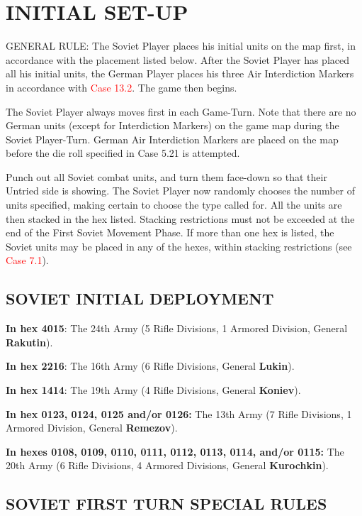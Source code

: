 \section{INITIAL SET-UP}
GENERAL RULE:
The Soviet Player places his initial units on the map first, in accordance with the placement listed below. After the Soviet Player has placed all his initial units, the German Player places his three Air Interdiction Markers in accordance with \textcolor{red}{Case 13.2}. The game then begins.

The Soviet Player always moves first in each Game-Turn. Note that there are no German units (except for Interdiction Markers) on the game map during the Soviet Player-Turn. German Air Interdiction Markers are placed on the map before the die roll specified in Case 5.21 is attempted.

Punch out all Soviet combat units, and turn them face-down so that their Untried side is showing. The Soviet Player now randomly chooses the number of units specified, making certain to choose the type called for. All the units are then stacked in the hex listed. Stacking restrictions must not be exceeded at the end of the First Soviet Movement Phase. If more than one hex is listed, the Soviet units may be placed in any of the hexes, within stacking restrictions (see \textcolor{red}{Case 7.1}).

\subsection{SOVIET INITIAL DEPLOYMENT}
\textbf{In hex 4015}:
The 24th Army (5 Rifle Divisions, 1 Armored Division, General \textbf{Rakutin}).

\textbf{In hex 2216}:
The 16th Army (6 Rifle Divisions, General \textbf{Lukin}).

\textbf{In hex 1414}:
The 19th Army (4 Rifle Divisions, General \textbf{Koniev}).

\textbf{In hex 0123, 0124, 0125 and/or 0126:}
The 13th Army (7 Rifle Divisions, 1 Armored Division, General \textbf{Remezov}).

\textbf{In hexes 0108, 0109, 0110, 0111, 0112, 0113, 0114, and/or 0115:}
The 20th Army (6 Rifle Divisions, 4 Armored Divisions, General \textbf{Kurochkin}).

\begin{flushleft}
  \subsection{SOVIET FIRST TURN SPECIAL RULES}
\end{flushleft}


